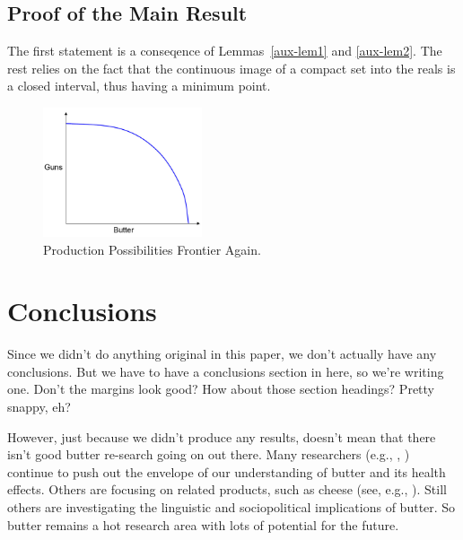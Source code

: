 \documentclass[opre,nonblindrev]{informs3}
\begin{document}
\subsection{Proof of the Main Result}

 The first statement is a conseqence of
Lemmas~\ref{aux-lem1} and \ref{aux-lem2}. The rest relies on the fact that the continuous
image of a compact set into the reals is a closed interval, thus having
a minimum point.\Halmos 
\endproof

\begin{figure}[t]
\begin{center}
\includegraphics[height=1.5in]{Sample-Figure}
\caption{Production Possibilities Frontier Again.} \label{ECfrontier}
\end{center}
\end{figure}



\section{Conclusions}

Since we didn't do anything original in this paper, we don't
actually have any conclusions.  But we have to have a conclusions
section in here, so we're writing one.  Don't the margins look good?
How about those section headings?  Pretty snappy, eh?

However, just because we didn't produce any results, doesn't mean
that there isn't good butter re-search going on out there.  Many
researchers 
(e.g., \citealt{trbn}, \citealt{h})
continue to push out the envelope of our understanding of butter and
its health effects.  Others are focusing on related products, such as cheese 
(see, e.g., \citealt{fo}).  
Still others are
investigating the linguistic 
\citep{fs}
and sociopolitical 
\citep{g}
implications of butter.  So butter
remains a hot research area with lots of potential for the future.
\end{document}
